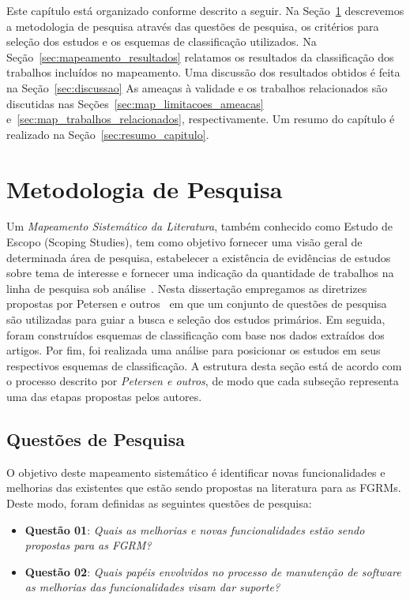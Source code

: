 Este capítulo está organizado conforme descrito a seguir. Na
Seção~\ref{sec:map-metodologia} descrevemos a metodologia de pesquisa através
das questões de pesquisa, os critérios para seleção dos estudos  e os esquemas
de classificação utilizados. Na Seção~\ref{sec:mapeamento_resultados} relatamos
os resultados da classificação dos trabalhos incluídos no mapeamento. Uma
discussão dos resultados obtidos é feita na Seção~\ref{sec:discussao} As ameaças
à validade e os trabalhos relacionados são discutidas nas
Seções~\ref{sec:map_limitacoes_ameacas} e~\ref{sec:map_trabalhos_relacionados},
respectivamente. Um resumo do capítulo é realizado na
Seção~\ref{sec:resumo_capitulo}.

\section{Metodologia de Pesquisa}
\label{sec:map-metodologia}

Um \textit{Mapeamento Sistemático da Literatura}, também conhecido como Estudo
de Escopo (Scoping Studies), tem como objetivo fornecer uma visão geral de
determinada área de pesquisa, estabelecer a existência de evidências de estudos
sobre tema de interesse e fornecer uma indicação da quantidade de trabalhos na
linha de pesquisa sob
análise~\cite{keele2007guidelines,wohlin2012experimentation}.  Nesta dissertação
empregamos as diretrizes propostas por Petersen e outros~\cite{Petersen2008} em
que um conjunto de questões de pesquisa são utilizadas para guiar a busca e
seleção dos estudos primários. Em seguida, foram construídos esquemas de
classificação com base nos dados extraídos dos artigos. Por fim, foi realizada
uma análise para posicionar os estudos em seus respectivos esquemas de
classificação. A estrutura desta seção está de acordo com o processo descrito
por \textit{Petersen e outros}, de modo que cada subseção representa uma das
etapas propostas pelos autores.

\subsection{Questões de Pesquisa}
\label{subsec:map-questoes-de-pesquisa}

O objetivo deste mapeamento sistemático é identificar novas funcionalidades e
melhorias das existentes que estão sendo propostas na literatura para as FGRMs.
Deste modo, foram definidas as seguintes questões de pesquisa:

\begin{itemize}
	\item \textbf{Questão 01}: \textit{Quais as melhorias e novas
			funcionalidades estão sendo propostas para as FGRM?}
	\item \textbf{Questão 02}: \textit{Quais papéis envolvidos no processo de
			manutenção de software as melhorias das funcionalidades visam dar
			suporte?}
\end{itemize}

